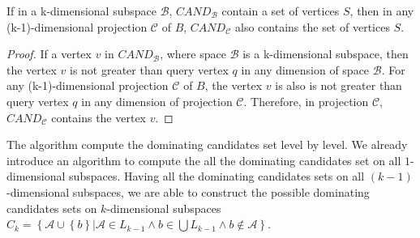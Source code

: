 \begin{property}
If in a k-dimensional subspace $\mathcal{B}$, $\mathit{CAND}_\mathcal{B}$ contain a set of vertices $S$, then in any (k-1)-dimensional projection $\mathcal{C}$ of $B$, $\mathit{CAND}_\mathcal{C}$ also contains the set of vertices $S$.
\end{property}

\begin{proof}
If a vertex $v$ in $\mathit{CAND}_\mathcal{B}$, where space $\mathcal{B}$ is a k-dimensional subspace, then the vertex $v$ is not greater than query vertex $q$ in any dimension of space $\mathcal{B}$. For any (k-1)-dimensional projection $\mathcal{C}$ of $B$, the vertex $v$ is also is not greater than query vertex $q$ in any dimension of projection $\mathcal{C}$. Therefore, in projection $\mathcal{C}$, $\mathit{CAND}_\mathcal{C}$ contains the vertex $v$.
\end{proof}

The algorithm compute the dominating candidates set level by level. We already introduce an algorithm to compute the all the dominating candidates set on all $1$-dimensional subspaces. Having all the dominating candidates sets on all $(k-1)$-dimensional subspaces, we are able to construct the possible dominating candidates sets on $k$-dimensional subspaces $C_k = \left\{\mathcal{A} \cup \left\{b\right\} | \mathcal{A} \in L_{k-1} \wedge b \in \bigcup L_{k-1} \wedge b \notin \mathcal{A} \right\}$.


